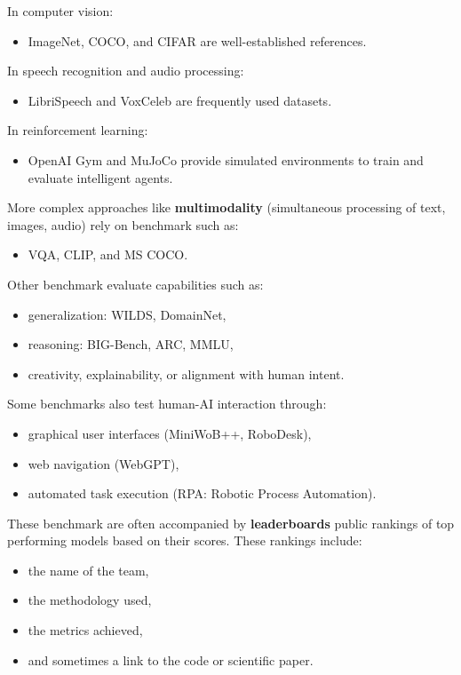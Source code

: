 \documentclass[12pt]{article}
\begin{document}
In computer vision:
\begin{itemize}[topsep=2pt,itemsep=1pt]
  \item ImageNet, COCO, and CIFAR are well-established references.
\end{itemize}

In speech recognition and audio processing:
\begin{itemize}[topsep=2pt,itemsep=1pt]
  \item LibriSpeech and VoxCeleb are frequently used datasets.
\end{itemize}

In reinforcement learning:
\begin{itemize}[topsep=2pt,itemsep=1pt]
  \item OpenAI Gym and MuJoCo provide simulated environments to train and evaluate intelligent agents.
\end{itemize}

More complex approaches like \textbf{multimodality} (simultaneous processing of text, images, audio) rely on benchmark such as:
\begin{itemize}[topsep=2pt,itemsep=1pt]
  \item VQA, CLIP, and MS COCO.
\end{itemize}

Other benchmark evaluate capabilities such as:
\begin{itemize}[topsep=2pt,itemsep=1pt]
  \item generalization: WILDS, DomainNet,
  \item reasoning: BIG-Bench, ARC, MMLU,
  \item creativity, explainability, or alignment with human intent.
\end{itemize}

Some benchmarks also test human-AI interaction through:
\begin{itemize}[topsep=2pt,itemsep=1pt]
  \item graphical user interfaces (MiniWoB++, RoboDesk),
  \item web navigation (WebGPT),
  \item automated task execution (RPA: Robotic Process Automation).
\end{itemize}

These benchmark are often accompanied by \textbf{leaderboards} public rankings of top performing models based on their scores. These rankings include:
\begin{itemize}[topsep=5pt,itemsep=1pt]
  \item the name of the team,
  \item the methodology used,
  \item the metrics achieved,
  \item and sometimes a link to the code or scientific paper.
\end{itemize}
\end{document}
